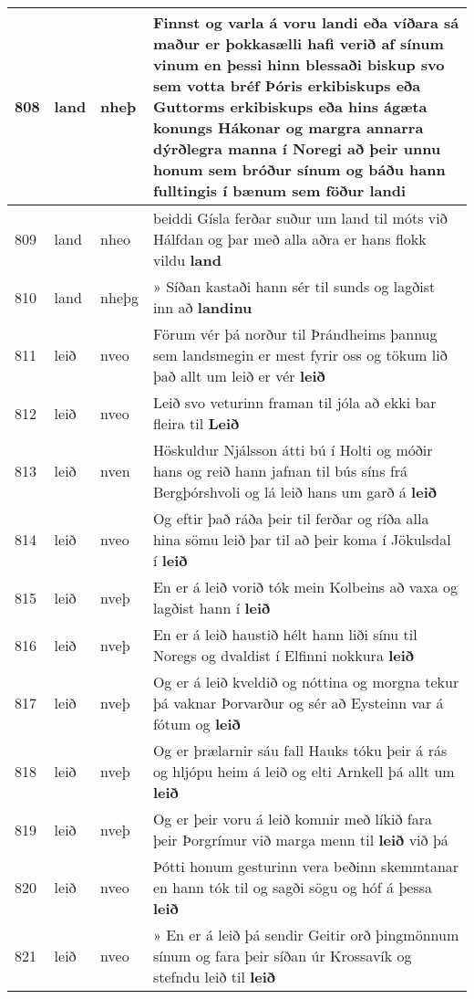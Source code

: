 \documentclass{article}
\begin{document}
\begin{longtable}{p{1cm}|p{1cm}|p{1cm}|p{13cm}}
\hline
808&land&nheþ&Finnst og varla á voru landi eða víðara sá maður er þokkasælli hafi verið af sínum vinum en þessi hinn blessaði biskup svo sem votta bréf Þóris erkibiskups eða Guttorms erkibiskups eða hins ágæta konungs Hákonar og margra annarra dýrðlegra manna í Noregi að þeir unnu honum sem bróður sínum og báðu hann fulltingis í bænum sem föður \textbf{landi} \\
\hline
809&land&nheo&beiddi Gísla ferðar suður um land til móts við Hálfdan og þar með alla aðra er hans flokk vildu \textbf{land} \\
\hline
810&land&nheþg&» Síðan kastaði hann sér til sunds og lagðist inn að \textbf{landinu} \\
\hline
811&leið&nveo&Förum vér þá norður til Þrándheims þannug sem landsmegin er mest fyrir oss og tökum lið það allt um leið er vér \textbf{leið} \\
\hline
812&leið&nveo&Leið svo veturinn framan til jóla að ekki bar fleira til \textbf{Leið} \\
\hline
813&leið&nven&Höskuldur Njálsson átti bú í Holti og móðir hans og reið hann jafnan til bús síns frá Bergþórshvoli og lá leið hans um garð á \textbf{leið} \\
\hline
814&leið&nveo&Og eftir það ráða þeir til ferðar og ríða alla hina sömu leið þar til að þeir koma í Jökulsdal í \textbf{leið} \\
\hline
815&leið&nveþ&En er á leið vorið tók mein Kolbeins að vaxa og lagðist hann í \textbf{leið} \\
\hline
816&leið&nveþ&En er á leið haustið hélt hann liði sínu til Noregs og dvaldist í Elfinni nokkura \textbf{leið} \\
\hline
817&leið&nveþ&Og er á leið kveldið og nóttina og morgna tekur þá vaknar Þorvarður og sér að Eysteinn var á fótum og \textbf{leið} \\
\hline
818&leið&nveþ&Og er þrælarnir sáu fall Hauks tóku þeir á rás og hljópu heim á leið og elti Arnkell þá allt um \textbf{leið} \\
\hline
819&leið&nveþ&Og er þeir voru á leið komnir með líkið fara þeir Þorgrímur við marga menn til \textbf{leið} við þá\\
\hline
820&leið&nveo&Þótti honum gesturinn vera beðinn skemmtanar en hann tók til og sagði sögu og hóf á þessa \textbf{leið} \\
\hline
821&leið&nveo&» En er á leið þá sendir Geitir orð þingmönnum sínum og fara þeir síðan úr Krossavík og stefndu leið til \textbf{leið} \\
\hline

\end{longtable}
\end{document}
